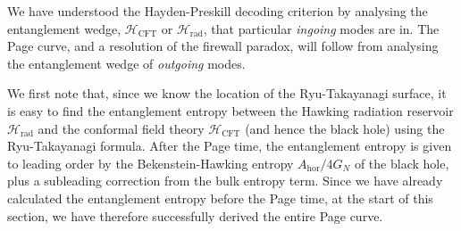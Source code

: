 \documentclass[11pt,a4paper]{article}
\begin{document}
We have understood the Hayden-Preskill decoding criterion by analysing the entanglement wedge, $\mathcal{H}_\text{CFT}$ or $\mathcal{H}_\text{rad}$, that particular \emph{ingoing} modes are in. The Page curve, and a resolution of the firewall paradox, will follow from analysing the entanglement wedge of \emph{outgoing} modes.

We first note that, since we know the location of the Ryu-Takayanagi surface, it is easy to find the entanglement entropy between the Hawking radiation reservoir $\mathcal{H}_\text{rad}$ and the conformal field theory $\mathcal{H}_\text{CFT}$ (and hence the black hole) using the Ryu-Takayanagi formula. After the Page time, the entanglement entropy is given to leading order by the Bekenstein-Hawking entropy $A_\text{hor}/4G_N$ of the black hole, plus a subleading correction from the bulk entropy term. Since we have already calculated the entanglement entropy before the Page time, at the start of this section, we have therefore successfully derived the entire Page curve.
\end{document}
